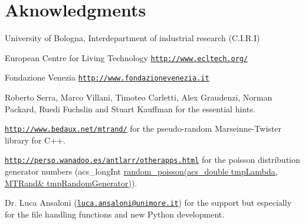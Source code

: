 \par
\par
 \hypertarget{intro_Aknowledgments}{}\section{Aknowledgments}\label{intro_Aknowledgments}



\begin{DoxyItemize}
\item University of Bologna, Interdepartment of industrial research (C.\-I.\-R.\-I)
\item European Centre for Living Technology \href{http://www.ecltech.org/}{\tt http\-://www.\-ecltech.\-org/}
\item Fondazione Venezia \href{http://www.fondazionevenezia.it}{\tt http\-://www.\-fondazionevenezia.\-it}
\item Roberto Serra, Marco Villani, Timoteo Carletti, Alex Graudenzi, Norman Packard, Ruedi Fuchslin and Stuart Kauffman for the essential hints.
\item \href{http://www.bedaux.net/mtrand/}{\tt http\-://www.\-bedaux.\-net/mtrand/} for the pseudo-\/random Marseinne-\/\-Twister library for C++.
\item \href{http://perso.wanadoo.es/antlarr/otherapps.html}{\tt http\-://perso.\-wanadoo.\-es/antlarr/otherapps.\-html} for the poisson distribution generator numbers (acs\-\_\-long\-Int \hyperlink{common_functions_8h_a22cddb6ffcf2250e0c90bc913728350f}{random\-\_\-poisson(acs\-\_\-double tmp\-Lambda, M\-T\-Rand\& tmp\-Random\-Generator)}).
\item Dr. Luca Ansaloni (\href{mailto:luca.ansaloni@unimore.it}{\tt luca.\-ansaloni@unimore.\-it}) for the support but especially for the file handling functions and new Python development. 
\end{DoxyItemize}